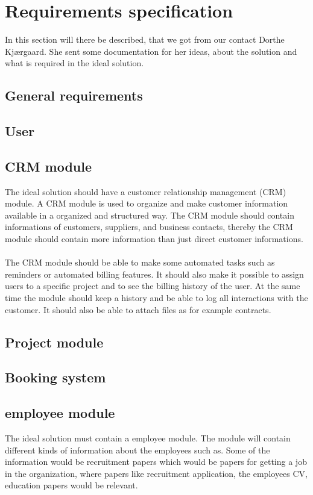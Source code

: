 \section{Requirements specification}
In this section will there be described, that we got from our contact Dorthe Kjærgaard. She sent some documentation for her ideas, about the solution and what is required in the ideal solution. 

\subsection{General requirements}

\subsection{User}


\subsection{CRM module}

The ideal solution should have a customer relationship management (CRM) module. A CRM module is used to organize and make customer information available in a organized and structured way. The CRM module should contain informations of customers, suppliers, and business contacts, thereby the CRM module should contain more information than just direct customer informations.\\
\\
The CRM module should be able to make some automated tasks such as reminders or automated billing features. It should also make it possible to assign users to a specific project and to see the billing history of the user. At the same time the module should keep a history and be able to log all interactions with the customer. It should also be able to attach files as for example contracts.

\subsection{Project module}

\subsection{Booking system}

\subsection{employee module}
The ideal solution must contain a employee module. The module will contain different kinds of information about the employees such as. Some of the information would be recruitment papers which would be papers for getting a job in the organization, where papers like recruitment application, the employees CV, education papers would be relevant. 

